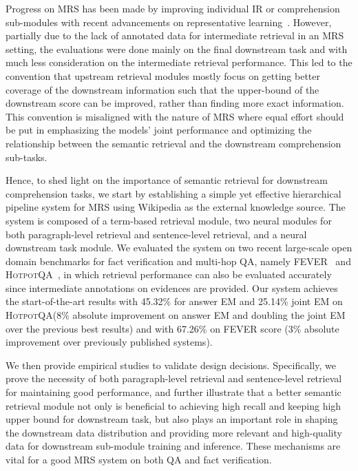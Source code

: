 \documentclass[11pt,a4paper]{article}
\newcommand\fever{FEVER\xspace}
\newcommand\hpqa{\textsc{HotpotQA}\xspace}
\begin{document}
Progress on MRS has been made by improving individual IR or comprehension sub-modules with recent advancements on representative learning~\cite{peters2018ELMo, radford2018gpt_1, devlin2018bert}.
However, partially due to the lack of annotated data for intermediate retrieval in an MRS setting, the evaluations were done mainly on the final downstream task and with much less consideration on the intermediate retrieval performance. This led to the convention that upstream retrieval modules mostly focus on getting better coverage of the downstream information such that the upper-bound of the downstream score can be improved, rather than finding more exact information. This convention is misaligned with the nature of MRS where equal effort should be put in emphasizing the models' joint performance and optimizing the relationship between the semantic retrieval and the downstream comprehension sub-tasks. 

Hence, to shed light on the importance of semantic retrieval for downstream comprehension tasks, we start by establishing a simple yet effective hierarchical pipeline system for MRS using Wikipedia as the external knowledge source. 
The system is composed of a term-based retrieval module, two neural modules for both paragraph-level retrieval and sentence-level retrieval, and a neural downstream task module.
We evaluated the system on two recent large-scale open domain benchmarks for fact verification and multi-hop QA, namely \fever~\cite{Thorne18Fever} and \hpqa~\cite{yang2018hotpotqa}, in which retrieval performance can also be evaluated accurately since intermediate annotations on evidences are provided.
Our system achieves the start-of-the-art results with 45.32\% for answer EM and 25.14\% joint EM on \hpqa (8\% absolute improvement on answer EM and doubling the joint EM over the previous best results) and with 67.26\% on \fever score (3\% absolute improvement over previously published systems).

We then provide empirical studies to validate design decisions. Specifically, we prove the necessity of both paragraph-level retrieval and sentence-level retrieval for maintaining good performance, and further illustrate that a better semantic retrieval module not only is beneficial to achieving high recall and keeping high upper bound for downstream task, but also plays an important role in shaping the downstream data distribution and providing more relevant and high-quality data for downstream sub-module training and inference. These mechanisms are vital for a good MRS system on both QA and fact verification.
\end{document}
